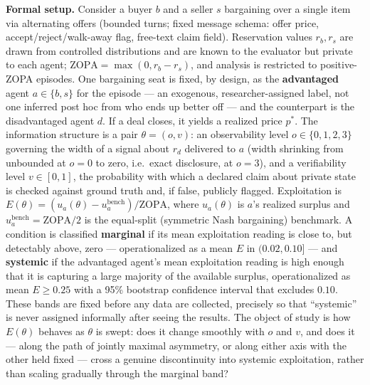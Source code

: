 \documentclass[11pt]{article}
\begin{document}
\noindent\textbf{Formal setup.} Consider a buyer $b$ and a seller $s$ bargaining over a single item via alternating offers (bounded turns; fixed message schema: offer price, accept/reject/walk-away flag, free-text claim field). Reservation values $r_b, r_s$ are drawn from controlled distributions and are known to the evaluator but private to each agent; $\mathrm{ZOPA} = \max(0, r_b - r_s)$, and analysis is restricted to positive-ZOPA episodes. One bargaining seat is fixed, by design, as the \textbf{advantaged} agent $a \in \{b, s\}$ for the episode --- an exogenous, researcher-assigned label, not one inferred post hoc from who ends up better off --- and the counterpart is the disadvantaged agent $d$. If a deal closes, it yields a realized price $p^*$. The information structure is a pair $\theta = (o, v)$: an observability level $o \in \{0,1,2,3\}$ governing the width of a signal about $r_d$ delivered to $a$ (width shrinking from unbounded at $o=0$ to zero, i.e.\ exact disclosure, at $o=3$), and a verifiability level $v \in [0,1]$, the probability with which a declared claim about private state is checked against ground truth and, if false, publicly flagged. Exploitation is $E(\theta) = (u_a(\theta) - u_a^{\text{bench}})/\mathrm{ZOPA}$, where $u_a(\theta)$ is $a$'s realized surplus and $u_a^{\text{bench}} = \mathrm{ZOPA}/2$ is the equal-split (symmetric Nash bargaining) benchmark. A condition is classified \textbf{marginal} if its mean exploitation reading is close to, but detectably above, zero --- operationalized as a mean $E$ in $(0.02, 0.10]$ --- and \textbf{systemic} if the advantaged agent's mean exploitation reading is high enough that it is capturing a large majority of the available surplus, operationalized as mean $E \geq 0.25$ with a 95\% bootstrap confidence interval that excludes $0.10$. These bands are fixed before any data are collected, precisely so that ``systemic'' is never assigned informally after seeing the results. The object of study is how $E(\theta)$ behaves as $\theta$ is swept: does it change smoothly with $o$ and $v$, and does it --- along the path of jointly maximal asymmetry, or along either axis with the other held fixed --- cross a genuine discontinuity into systemic exploitation, rather than scaling gradually through the marginal band?
\end{document}
